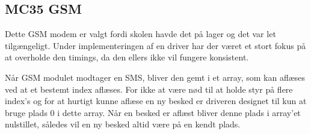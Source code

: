 \subsection{MC35 GSM}

Dette GSM modem er valgt fordi skolen havde det på lager og det var let tilgængeligt.
Under implementeringen af en driver har der været et stort fokus på at overholde den timings, da den ellers ikke vil fungere konsistent.

Når GSM modulet modtager en SMS, bliver den gemt i et array, som kan aflæses ved at et bestemt index aflæses. For ikke at være nød til at holde styr på flere index's og for at hurtigt kunne aflæse en ny besked er driveren designet til kun at bruge plads 0 i dette array. Når en besked er aflæst bliver denne plads i array'et nulstillet, således vil en ny besked altid være på en kendt plads.




